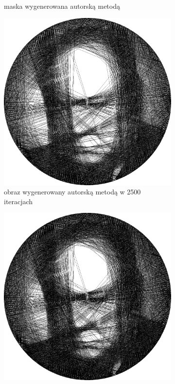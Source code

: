 \documentclass[a4paper, 12pt, polish, twoside]{extreport}
\begin{document}
\begin{figure}[H]
\begin{subfigure}{0.30\textwidth}
        \caption{maska wygenerowana autorską metodą}
        \label{comp-comp-churchill-f}
    \end{subfigure}
    \begin{subfigure}{0.30\textwidth}
        \centering
        \includegraphics[width = \textwidth]{img/6-comp/churchill_e_i2500_c20_inv0_bg1_obj2_ed1.png}
        \caption{obraz wygenerowany autorską metodą w 2500 iteracjach}
        \label{comp-comp-churchill-g}
    \end{subfigure}
    \begin{subfigure}{0.30\textwidth}
        \centering
        \includegraphics[width = \textwidth]{img/6-comp/churchill_e_i3000_c20_inv0_bg1_obj2_ed1.png}

\end{subfigure}
\end{figure}
\end{document}
